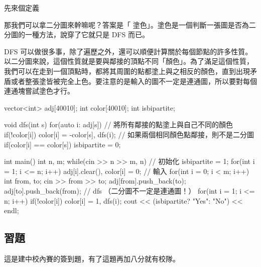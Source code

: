 \documentclass[main.tex]{subfiles}
\begin{document}
先來個定義\\


那我們可以拿二分圖來幹嘛呢？答案是「 塗色」。塗色是一個判斷一張圖是否為二分圖的一種方法，說穿了它就只是 DFS 而已。\\


DFS 可以做很多事，除了遍歷之外，還可以順便計算關於每個節點的許多性質。以二分圖來說，這個性質就是要與鄰接的頂點不同「顏色」。為了滿足這個性質，我們可以在走到一個頂點時，都將其周圍的點都塗上與之相反的顏色，直到出現矛盾或者整張塗皆被完全上色。要注意的是輸入的圖不一定是連通圖，所以要對每個連通塊嘗試塗色才行。

\begin{C++}
vector<int> adj[40010];
int color[40010];
int isbipartite;

void dfs(int s){
    for(auto i: adj[s]){
        // 將所有鄰接的點塗上與自己不同的顏色
        if(!color[i]) color[i] = -color[s], dfs(i);
        // 如果兩個相同顏色點鄰接，則不是二分圖
        if(color[i] == color[s]) isbipartite = 0;
    }
}

int main(){
    int n, m;
    while(cin >> n >> m, n){
        // 初始化
        isbipartite = 1;
        for(int i = 1; i <= n; i++){
            adj[i].clear(), color[i] = 0;
        }
        // 輸入
        for(int i = 0; i < m; i++){
            int from, to;
            cin >> from >> to;
            adj[from].push_back(to);
            adj[to].push_back(from);
        }
        // dfs （二分圖不一定是連通圖！）
        for(int i = 1; i <= n; i++){
            if(!color[i]) color[i] = 1, dfs(i);
        }
        cout << (isbipartite? "Yes": "No") << endl;
    }
}
\end{C++}

\subsection{習題}
這是建中校內賽的簽到題，有了這題再加八分就有校隊。\\

\end{document}
